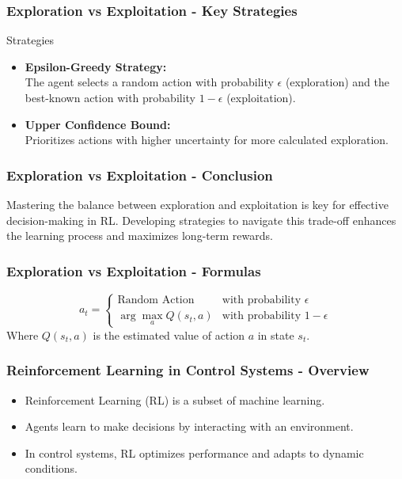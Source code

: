 \documentclass[aspectratio=169]{beamer}
\begin{document}
\begin{frame}[fragile]
  \frametitle{Exploration vs Exploitation - Key Strategies}
  \begin{block}{Strategies}
  \begin{itemize}
    \item \textbf{Epsilon-Greedy Strategy:} \\
    The agent selects a random action with probability $\epsilon$ (exploration) and the best-known action with probability $1 - \epsilon$ (exploitation).
    
    \item \textbf{Upper Confidence Bound:} \\
    Prioritizes actions with higher uncertainty for more calculated exploration.
  \end{itemize}
  \end{block}
\end{frame}

\begin{frame}[fragile]
  \frametitle{Exploration vs Exploitation - Conclusion}
  Mastering the balance between exploration and exploitation is key for effective decision-making in RL. Developing strategies to navigate this trade-off enhances the learning process and maximizes long-term rewards.
\end{frame}

\begin{frame}[fragile]
  \frametitle{Exploration vs Exploitation - Formulas}
  \begin{equation}
  a_t = 
  \begin{cases} 
  \text{Random Action} & \text{with probability } \epsilon \\
  \arg\max_a Q(s_t, a) & \text{with probability } 1 - \epsilon 
  \end{cases}
  \end{equation}
  Where \( Q(s_t, a) \) is the estimated value of action \( a \) in state \( s_t \).
\end{frame}

\begin{frame}[fragile]
    \frametitle{Reinforcement Learning in Control Systems - Overview}
    \begin{itemize}
        \item Reinforcement Learning (RL) is a subset of machine learning.
        \item Agents learn to make decisions by interacting with an environment.
        \item In control systems, RL optimizes performance and adapts to dynamic conditions.
    \end{itemize}
\end{frame}
\end{document}
